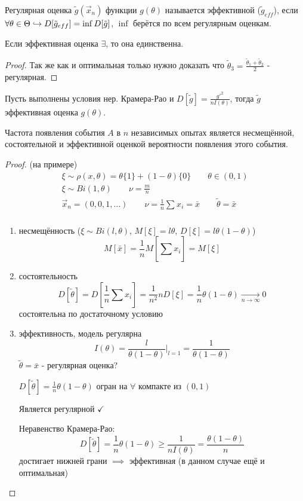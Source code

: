 \documentclass{article}
\begin{document}
\begin{definition}
  Регулярная оценка $\tilde{g}(\vec{x}_n)$ функции $g(\theta)$ называется 
  эффективной ($\tilde{g}_{eff}$), если 
  $\forall \theta\in\Theta \hookrightarrow D[\tilde{g}_{ef f}]=\inf D[\tilde{g}]$,
  $\inf$ берётся по всем регулярным оценкам.
\end{definition}
\begin{theorem}
  Если эффективная оценка $\exists$,
  то она единственна.
\end{theorem}
\begin{proof}
  Так же как и оптимальная только нужно доказать что
  $\tilde{\theta}_{3}=\frac{\tilde{\theta}_{1}+\tilde{\theta}_{2}}{2}$ - регулярная.
\end{proof}
\begin{theorem}
  Пусть выполнены условия нер. Крамера-Рао и
  $D[\tilde{g}]=\frac{g'^{2}}{nI(\theta)}$, тогда
  $\tilde{g}$ эффективная оценка $g(\theta)$.
\end{theorem}
\begin{theorem}
  Частота появления события $A$ в $n$ независимых опытах является несмещённой,
  состоятельной и эффективной оценкой вероятности появления этого события.
\end{theorem}
\begin{proof} (на примере)
  \begin{gather*}
    \xi \sim \rho(x,\theta)=\theta\{1\} + (1-\theta)\{0\} \qquad \theta \in (0,1) \\ 
    \xi \sim Bi(1,\theta) \qquad \nu=\frac{m}{n} \\ 
    \vec{x}_n=(0,0,1,\dots ) \qquad \nu=\frac{1}{n}\sum_{}^{}x_i=\bar{x} \qquad \tilde{\theta}=\bar{x} \\ 
  \end{gather*}
  \begin{enumerate}
    \item несмещённость ($\xi\sim Bi(l,\theta)$, $M[\xi]=l\theta$, $D[\xi]=l\theta(1-\theta)$)
      \[
        M[\bar{x}]=\frac{1}{n}M[\sum_{}^{}x_i]=M[\xi]
      \]
    \item состоятельность 
      \[
        D[\tilde{\theta}]=D[\frac{1}{n}\sum_{}^{}x_i]=\frac{1}{n^{2}}nD[\xi]=\frac{1}{n}\theta(1-\theta) \underset{n\to\infty}{\to}0
      \]
      состоятельна по достаточному условию
    \item эффективность, модель регулярна
      \[
        I(\theta)=\frac{l}{\theta(1-\theta)}\Big|_{l=1}=\frac{1}{\theta(1-\theta)}
      \]
      $\tilde{\theta}=\bar{x}$ - регулярная оценка?

      $D[\tilde{\theta}]=\frac{1}{n}\theta(1-\theta)$ огран на $\forall$ компакте из $(0,1)$

      Является регулярной $\checkmark$

      Неравенство Крамера-Рао:
      \[
        D[\tilde{\theta}]=\frac{1}{n}\theta(1-\theta) \ge \frac{1}{nI(\theta)}=\frac{\theta(1-\theta)}{n}
      \]
      достигает нижней грани $\implies$ эффективная (в данном случае ещё и оптимальная)
  \end{enumerate}
\end{proof}
\end{document}

